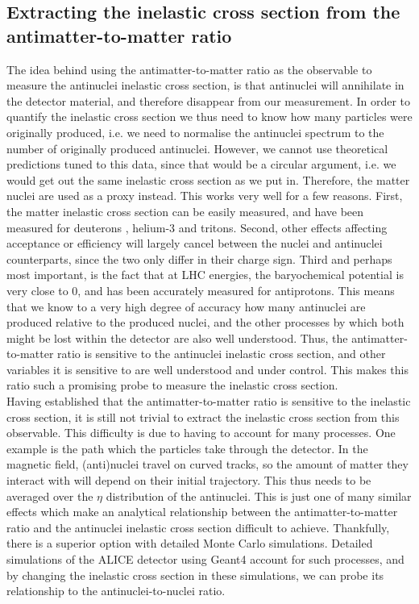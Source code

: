 \subsection{Extracting the inelastic cross section from the antimatter-to-matter ratio}
The idea behind using the antimatter-to-matter ratio as the observable to measure the antinuclei inelastic cross section, is that antinuclei will annihilate in the detector material, and therefore disappear from our measurement. In order to quantify the inelastic cross section we thus need to know how many particles were originally produced, i.e. we need to normalise the antinuclei spectrum to the number of originally produced antinuclei. However, we cannot use theoretical predictions tuned to this data, since that would be a circular argument, i.e. we would get out the same inelastic cross section as we put in. Therefore, the matter nuclei are used as a proxy instead. This works very well for a few reasons. First, the matter inelastic cross section can be easily measured, and have been measured for deuterons \cite{}, helium-3\cite{} and tritons\cite{}. Second, other effects affecting acceptance or efficiency will largely cancel between the nuclei and antinuclei counterparts, since the two only differ in their charge sign. Third and perhaps most important, is the fact that at LHC energies, the baryochemical potential is very close to 0, and has been accurately measured for antiprotons. This means that we know to a very high degree of accuracy how many antinuclei are produced relative to the produced nuclei, and the other processes by which both might be lost within the detector are also well understood. Thus, the antimatter-to-matter ratio is sensitive to the antinuclei inelastic cross section, and other variables it is sensitive to are well understood and under control. This makes this ratio such a promising probe to measure the inelastic cross section.\\

Having established that the antimatter-to-matter ratio is sensitive to the inelastic cross section, it is still not trivial to extract the inelastic cross section from this observable. This difficulty is due to having to account for many processes. One example is the path which the particles take through the detector. In the magnetic field, (anti)nuclei travel on curved tracks, so the amount of matter they interact with will depend on their initial trajectory. This thus needs to be averaged over the $\eta$ distribution of the antinuclei. This is just one of many similar effects which make an analytical relationship between the antimatter-to-matter ratio and the antinuclei inelastic cross section difficult to achieve. Thankfully, there is a superior option with detailed Monte Carlo simulations. Detailed simulations of the ALICE detector using Geant4 account for such processes, and by changing the inelastic cross section in these simulations, we can probe its relationship to the antinuclei-to-nuclei ratio.
